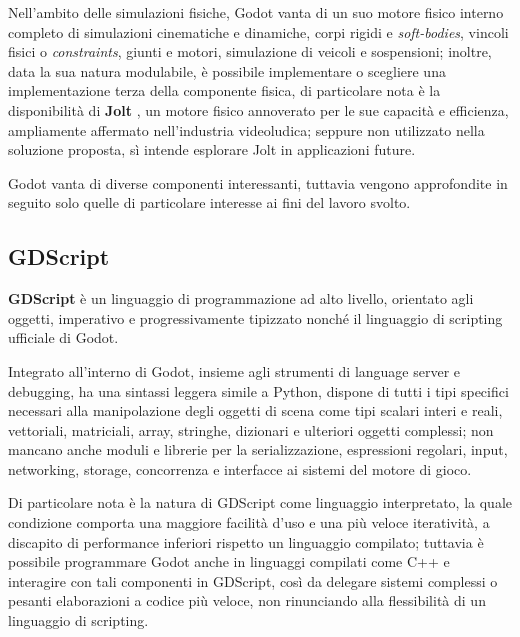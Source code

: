 \medbreak
Nell'ambito delle simulazioni fisiche, Godot vanta di un suo motore fisico interno completo di simulazioni cinematiche e dinamiche, corpi rigidi e \textit{soft-bodies}, vincoli fisici o \textit{constraints}, giunti e motori, simulazione di veicoli e sospensioni; inoltre, data la sua natura modulabile, è possibile implementare o scegliere una implementazione terza della componente fisica, di particolare nota è la disponibilità di \textbf{Jolt} \cite{JoltPhysics}, un motore fisico annoverato per le sue capacità e efficienza, ampliamente affermato nell'industria videoludica; seppure non utilizzato nella soluzione proposta, sì intende esplorare Jolt in applicazioni future.

Godot vanta di diverse componenti interessanti, tuttavia vengono approfondite in seguito solo quelle di particolare interesse ai fini del lavoro svolto.

\subsection{GDScript}
\textbf{GDScript} \cite{GodotGDScriptDocs} è un linguaggio di programmazione ad alto livello, orientato agli oggetti, imperativo e progressivamente tipizzato nonché il linguaggio di scripting ufficiale di Godot.
\medskip

Integrato all'interno di Godot, insieme agli strumenti di language server e debugging, ha una sintassi leggera simile a Python, dispone di tutti i tipi specifici necessari alla manipolazione degli oggetti di scena come tipi scalari interi e reali, vettoriali, matriciali, array, stringhe, dizionari e ulteriori oggetti complessi; non mancano anche moduli e librerie per la serializzazione, espressioni regolari, input, networking, storage, concorrenza e interfacce ai sistemi del motore di gioco.

Di particolare nota è la natura di GDScript come linguaggio interpretato, la quale condizione comporta una maggiore facilità d'uso e una più veloce iteratività, a discapito di performance inferiori rispetto un linguaggio compilato; tuttavia è possibile programmare Godot anche in linguaggi compilati come C++ e interagire con tali componenti in GDScript, così da delegare sistemi complessi o pesanti elaborazioni a codice più veloce, non rinunciando alla flessibilità di un linguaggio di scripting.

